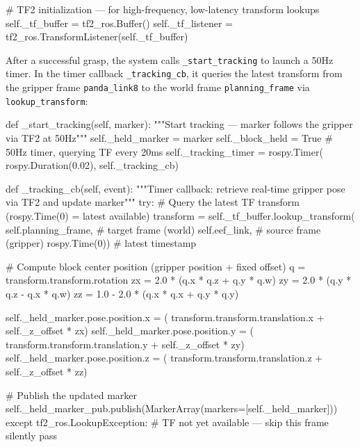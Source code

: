 \documentclass[12pt, a4paper]{article}
\begin{document}
\begin{pythoncode}
# TF2 initialization — for high-frequency, low-latency transform lookups
self._tf_buffer = tf2_ros.Buffer()
self._tf_listener = tf2_ros.TransformListener(self._tf_buffer)
\end{pythoncode}

After a successful grasp, the system calls \texttt{\_start\_tracking} to launch a 50Hz timer. In the timer callback \texttt{\_tracking\_cb}, it queries the latest transform from the gripper frame \texttt{panda\_link8} to the world frame \texttt{planning\_frame} via \texttt{lookup\_transform}:

\begin{pythoncode}
def _start_tracking(self, marker):
    """Start tracking — marker follows the gripper via TF2 at 50Hz"""
    self._held_marker = marker
    self._block_held = True
    # 50Hz timer, querying TF every 20ms
    self._tracking_timer = rospy.Timer(
        rospy.Duration(0.02), self._tracking_cb)

def _tracking_cb(self, event):
    """Timer callback: retrieve real-time gripper pose via TF2 and update marker"""
    try:
        # Query the latest TF transform (rospy.Time(0) = latest available)
        transform = self._tf_buffer.lookup_transform(
            self.planning_frame,   # target frame (world)
            self.eef_link,         # source frame (gripper)
            rospy.Time(0))         # latest timestamp
        
        # Compute block center position (gripper position + fixed offset)
        q = transform.transform.rotation
        zx = 2.0 * (q.x * q.z + q.y * q.w)
        zy = 2.0 * (q.y * q.z - q.x * q.w)
        zz = 1.0 - 2.0 * (q.x * q.x + q.y * q.y)
        
        self._held_marker.pose.position.x = (
            transform.transform.translation.x + self._z_offset * zx)
        self._held_marker.pose.position.y = (
            transform.transform.translation.y + self._z_offset * zy)
        self._held_marker.pose.position.z = (
            transform.transform.translation.z + self._z_offset * zz)
        
        # Publish the updated marker
        self._held_marker_pub.publish(MarkerArray(markers=[self._held_marker]))
    except tf2_ros.LookupException:
        # TF not yet available — skip this frame silently
        pass
\end{pythoncode}
\end{document}
